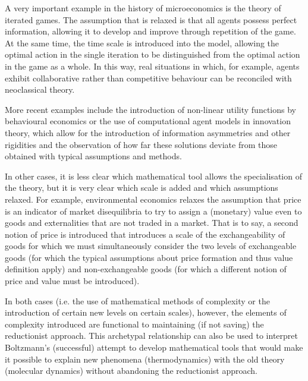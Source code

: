 \documentclass[a4paper, headings=standardclasses]{scrartcl}
\begin{document}
A very important example in the history of microeconomics is the theory of iterated games. The assumption that is relaxed is that all agents possess perfect information, allowing it to develop and improve through repetition of the game. At the same time, the time scale is introduced into the model, allowing the optimal action in the single iteration to be distinguished from the optimal action in the game as a whole.
In this way, real situations in which, for example, agents exhibit collaborative rather than competitive behaviour can be reconciled with neoclassical theory.

More recent examples include the introduction of non-linear utility functions
by behavioural economics or the use of computational agent models in innovation theory, which allow for the introduction of information asymmetries and other rigidities and the observation of how far these solutions deviate from those obtained with typical assumptions and methods.

In other cases, it is less clear which mathematical tool allows the specialisation of the theory, but it is very clear which scale is added and which assumptions relaxed. For example, environmental economics relaxes the assumption that price is an indicator of market disequilibria to try to assign a (monetary) value even to goods and externalities that are not traded in a market.
That is to say, a second notion of price is introduced that introduces a scale of the exchangeability of goods for which we must simultaneously consider the two levels of exchangeable goods (for which the typical assumptions about price formation and thus value definition apply) and non-exchangeable goods (for which a different notion of price and value must be introduced).

In both cases (i.e. the use of mathematical methods of complexity or the introduction of certain new levels on certain scales), however, the elements of complexity introduced are functional to maintaining (if not saving) the reductionist approach.
This archetypal relationship can also be used to interpret Boltzmann's (successful) attempt to develop mathematical tools that would make it possible to explain new phenomena (thermodynamics) with the old theory (molecular dynamics) without abandoning the reductionist approach.
\end{document}
